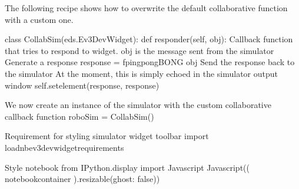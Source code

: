 \documentclass[letterpaper,10pt,english]{sphinxmanual}
\begin{document}
{The following recipe shows how to overwrite the default collaborative  function with a custom one.

{
\begin{sphinxVerbatim}[commandchars=\\\{\}]
\llap{\color{nbsphinxin}[ ]:\,\hspace{\fboxrule}\hspace{\fboxsep}}class CollabSim(eds.Ev3DevWidget):
     def responder(self, obj):
        \PYGZdq{}\PYGZdq{}\PYGZdq{} Callback function that tries to respond to widget.\PYGZdq{}\PYGZdq{}\PYGZdq{}
        \PYGZsh{} obj is the message sent from the simulator
        \PYGZsh{}Generate a response
        response = f\PYGZsq{}pingpongBONG \PYGZob{}obj\PYGZcb{}\PYGZsq{}
        \PYGZsh{}Send the response back to the simulator
        \PYGZsh{}At the moment, this is simply echoed in the simulator output window
        self.set\PYGZus{}element(\PYGZdq{}response\PYGZdq{}, response)

\PYGZsh{} We now create an instance of the simulator with the custom collaborative callback function
roboSim = CollabSim()
\end{sphinxVerbatim}
}

{
\begin{sphinxVerbatim}[commandchars=\\\{\}]
\llap{\color{nbsphinxin}[ ]:\,\hspace{\fboxrule}\hspace{\fboxsep}}\PYGZsh{}Requirement for styling simulator widget toolbar
import \PYGZus{}load\PYGZus{}nbev3devwidget\PYGZus{}requirements
\end{sphinxVerbatim}
}

{
\begin{sphinxVerbatim}[commandchars=\\\{\}]
\llap{\color{nbsphinxin}[ ]:\,\hspace{\fboxrule}\hspace{\fboxsep}}\PYGZsh{}Style notebook
from IPython.display import Javascript
Javascript(\PYGZsq{}\PYGZdl{}( \PYGZdq{}\PYGZsh{}notebook\PYGZhy{}container\PYGZdq{} ).resizable(\PYGZob{}ghost: false\PYGZcb{})\PYGZsq{})


\end{sphinxVerbatim}}}
\end{document}
